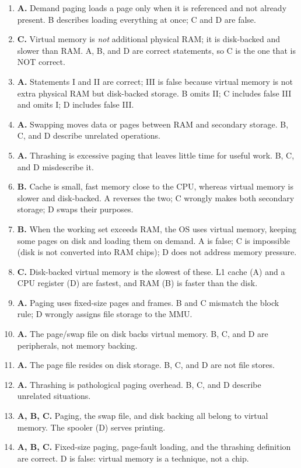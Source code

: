 \documentclass[11pt]{article}
\begin{document}
\begin{enumerate}[label=\textbf{Q\arabic*.}, leftmargin=*]
  RAM and must be loaded from disk. A calls it a hardware fault, which is
  wrong; C and D describe unrelated failures.
\item \textbf{A.} Demand paging loads a page only when it is referenced and not
  already present. B describes loading everything at once; C and D are false.
\item \textbf{C.} Virtual memory is \emph{not} additional physical RAM; it is
  disk-backed and slower than RAM. A, B, and D are correct statements, so C is
  the one that is NOT correct.
\item \textbf{A.} Statements I and II are correct; III is false because virtual
  memory is not extra physical RAM but disk-backed storage. B omits II; C
  includes false III and omits I; D includes false III.
\item \textbf{A.} Swapping moves data or pages between RAM and secondary
  storage. B, C, and D describe unrelated operations.
\item \textbf{A.} Thrashing is excessive paging that leaves little time for
  useful work. B, C, and D misdescribe it.
\item \textbf{B.} Cache is small, fast memory close to the CPU, whereas virtual
  memory is slower and disk-backed. A reverses the two; C wrongly makes both
  secondary storage; D swaps their purposes.
\item \textbf{B.} When the working set exceeds RAM, the OS uses virtual memory,
  keeping some pages on disk and loading them on demand. A is false; C is
  impossible (disk is not converted into RAM chips); D does not address memory
  pressure.
\item \textbf{C.} Disk-backed virtual memory is the slowest of these. L1 cache
  (A) and a CPU register (D) are fastest, and RAM (B) is faster than the disk.
\item \textbf{A.} Paging uses fixed-size pages and frames. B and C mismatch the
  block rule; D wrongly assigns file storage to the MMU.

\item \textbf{A.} The page/swap file on disk backs virtual memory. B, C, and D are peripherals, not memory backing.
\item \textbf{A.} The page file resides on disk storage. B, C, and D are not file stores.
\item \textbf{A.} Thrashing is pathological paging overhead. B, C, and D describe unrelated situations.
\item \textbf{A, B, C.} Paging, the swap file, and disk backing all belong to virtual memory. The spooler (D) serves printing.
\item \textbf{A, B, C.} Fixed-size paging, page-fault loading, and the thrashing definition are correct. D is false: virtual memory is a technique, not a chip.
\end{enumerate}
\def\JKSSBLessonID{9}\def\JKSSBAnswers{1}
\end{document}

